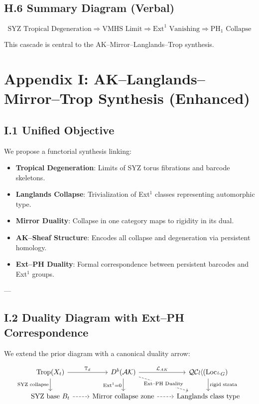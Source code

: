\documentclass[11pt]{article}
\begin{document}
\subsection*{H.6 Summary Diagram (Verbal)}

\[
\text{SYZ Tropical Degeneration}
\Rightarrow
\text{VMHS Limit}
\Rightarrow
\mathrm{Ext}^1 \text{ Vanishing}
\Rightarrow
\mathrm{PH}_1 \text{ Collapse}
\]

This cascade is central to the AK–Mirror–Langlands–Trop synthesis.



\section*{Appendix I: AK–Langlands–Mirror–Trop Synthesis (Enhanced)}

\subsection*{I.1 Unified Objective}

We propose a functorial synthesis linking:

\begin{itemize}
  \item \textbf{Tropical Degeneration}: Limits of SYZ torus fibrations and barcode skeletons.
  \item \textbf{Langlands Collapse}: Trivialization of Ext$^1$ classes representing automorphic type.
  \item \textbf{Mirror Duality}: Collapse in one category maps to rigidity in its dual.
  \item \textbf{AK–Sheaf Structure}: Encodes all collapse and degeneration via persistent homology.
  \item \textbf{Ext–PH Duality}: Formal correspondence between persistent barcodes and Ext${}^1$ groups.
\end{itemize}

---

\subsection*{I.2 Duality Diagram with Ext–PH Correspondence}

We extend the prior diagram with a canonical duality arrow:

\[
\begin{tikzcd}
\mathrm{Trop}(X_t) \arrow[r, "\mathbb{T}_d"] \arrow[d, "\text{SYZ collapse}"'] &
D^b(\mathcal{AK}) \arrow[r, "\mathcal{L}_{AK}"] \arrow[d, "\mathrm{Ext}^1 = 0"'] \arrow[dr, dashed, "\text{Ext--PH Duality}" description] &
\mathcal{QCoh}(\mathrm{Loc}_{^LG}) \arrow[d, "\text{rigid strata}"] \\
\text{SYZ base } B_t \arrow[r, dashed] &
\text{Mirror collapse zone} \arrow[r, dashed] &
\text{Langlands class type}
\end{tikzcd}
\]
\end{document}
